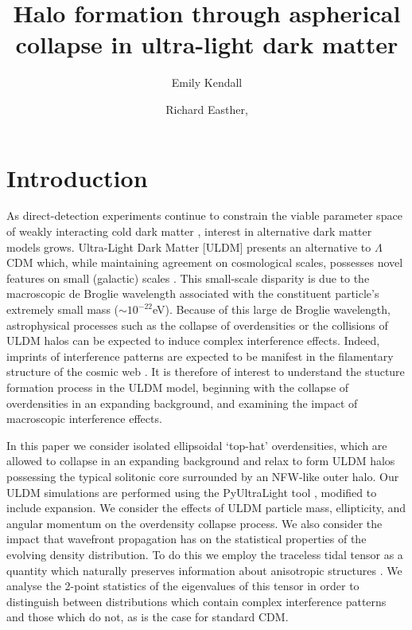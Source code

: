 \documentclass[a4paper,11pt]{article}
\title{\boldmath Halo formation through aspherical collapse in ultra-light dark matter}
\author[a]{Emily Kendall}
\author[c]{Richard Easther,}
\affiliation[a]{The University of Auckland, Private Bag 92019\\
Auckland 1142, New Zealand}
\begin{document}
\maketitle
\flushbottom

\section{Introduction}
\label{sec:intro}


As direct-detection experiments continue to constrain the viable parameter space of weakly interacting cold dark matter \cite{Schumann:2019eaa}, interest in alternative dark matter models grows. Ultra-Light Dark Matter [ULDM] presents an alternative to $\Lambda$CDM which, while maintaining agreement on cosmological scales, possesses novel features on small (galactic) scales \cite{Hui:2016ltb}. This small-scale disparity is due to the macroscopic de Broglie wavelength associated with the constituent particle's extremely small mass ($\sim10^{-22}$eV). Because of this large de Broglie wavelength, astrophysical processes such as the collapse of overdensities or the collisions of ULDM halos can be expected to induce complex interference effects. Indeed, imprints of interference patterns are expected to be manifest in the filamentary structure of the cosmic web \cite{Mocz:2019emo}. It is therefore of interest to understand the stucture formation process in the ULDM model, beginning with the collapse of overdensities in an expanding background, and examining the impact of macroscopic interference effects. 

In this paper we consider isolated ellipsoidal `top-hat' overdensities, which are allowed to collapse in an expanding background and relax to form ULDM halos possessing the typical solitonic core surrounded by an NFW-like outer halo. Our ULDM simulations are performed using the {\sc PyUltraLight} tool \cite{Edwards:2018ccc}, modified to include expansion.
We consider the effects of ULDM particle mass, ellipticity, and angular momentum on the overdensity collapse process. We also consider the impact that wavefront propagation has on the statistical properties of the evolving density distribution. To do this we employ the traceless tidal tensor as a quantity which naturally preserves information about anisotropic structures \cite{Lee:2009uv}. We analyse the 2-point statistics of the eigenvalues of this tensor in order to distinguish between distributions which contain complex interference patterns and those which do not, as is the case for standard CDM.
\end{document}
